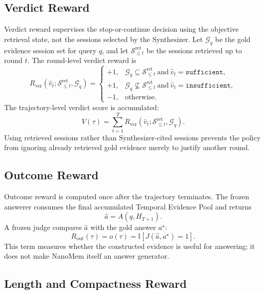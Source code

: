 \subsection{Verdict Reward}
\label{subsec:methods-verdict}

Verdict reward supervises the stop-or-continue decision using the objective
retrieval state, not the sessions selected by the Synthesizer. Let
$\mathcal{G}_q$ be the gold evidence session set for query $q$, and let
$\mathcal{S}^{\mathrm{ret}}_{\le t}$ be the sessions retrieved up to round $t$.
The round-level verdict reward is
\[
R_{\mathrm{ver}}
(\hat{v}_t;\mathcal{S}^{\mathrm{ret}}_{\le t},\mathcal{G}_q)=
\begin{cases}
+1, & \mathcal{G}_q\subseteq\mathcal{S}^{\mathrm{ret}}_{\le t}
\ \text{and}\ \hat{v}_t=\texttt{sufficient},\\
+1, & \mathcal{G}_q\not\subseteq\mathcal{S}^{\mathrm{ret}}_{\le t}
\ \text{and}\ \hat{v}_t=\texttt{insufficient},\\
-1, & \text{otherwise}.
\end{cases}
\label{eq:verdict-reward}
\]
The trajectory-level verdict score is accumulated:
\[
  V(\tau)=\sum_{t=1}^{T}
  R_{\mathrm{ver}}
  (\hat{v}_t;\mathcal{S}^{\mathrm{ret}}_{\le t},\mathcal{G}_q).
  \label{eq:verdict-sum}
\]
Using retrieved sessions rather than Synthesizer-cited sessions prevents the
policy from ignoring already retrieved gold evidence merely to justify another
round.

\subsection{Outcome Reward}
\label{subsec:methods-outcome}

Outcome reward is computed once after the trajectory terminates. The frozen
answerer consumes the final accumulated Temporal Evidence Pool and returns
\[
  \hat{a}=A(q,H_{T+1}).
\]
A frozen judge compares $\hat{a}$ with the gold answer $a^\star$:
\[
  R_{\mathrm{out}}(\tau)=o(\tau)
  =
  \mathbb{I}\!\left[J(\hat{a},a^\star)=1\right].
  \label{eq:outcome-reward}
\]
This term measures whether the constructed evidence is useful for answering; it
does not make NanoMem itself an answer generator.

\subsection{Length and Compactness Reward}
\label{subsec:methods-length}


